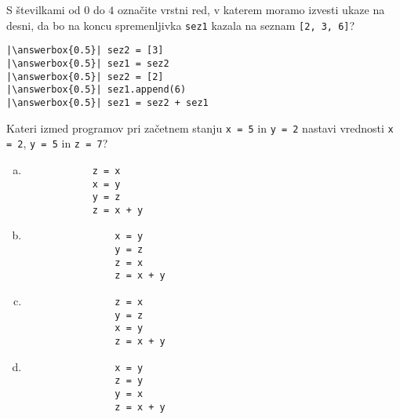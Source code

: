 \documentclass[arhiv, 10pt]{../izpit}
\newcommand{\inlinepy}[1]{\texttt{#1}}
\newcommand{\answerbox}[1]{\framebox{\vphantom{\large M}\hspace{#1cm}}}
\begin{document}
        \naloga*
        \begin{multicols}{2}
        \noindent 
        S številkami od $0$ do $4$ označite vrstni red, v katerem moramo izvesti ukaze na desni, da bo na koncu spremenljivka \inlinepy{sez1} kazala na seznam \inlinepy{[2, 3, 6]}?
    
        \columnbreak
        \noindent
        \begin{verbatim}
|\answerbox{0.5}| sez2 = [3]
|\answerbox{0.5}| sez1 = sez2
|\answerbox{0.5}| sez2 = [2]
|\answerbox{0.5}| sez1.append(6)
|\answerbox{0.5}| sez1 = sez2 + sez1

        \end{verbatim}
        \end{multicols}
    
            
        \naloga*
        
        Kateri izmed programov pri začetnem stanju
            \inlinepy{x = 5} in
            \inlinepy{y = 2}
        nastavi vrednosti
            \inlinepy{x = 2},
            \inlinepy{y = 5} in
            \inlinepy{z = 7}?
    
        \begin{multicols}{4}
        \begin{enumerate}[(a)]
\item 
            \begin{verbatim}
            z = x
            x = y
            y = z
            z = x + y
            \end{verbatim}
        
\item 
                \begin{verbatim}
                x = y
                y = z
                z = x
                z = x + y
                \end{verbatim}
            
\item 
                \begin{verbatim}
                z = x
                y = z
                x = y
                z = x + y
                \end{verbatim}
            
\item 
                \begin{verbatim}
                x = y
                z = y
                y = x
                z = x + y
                \end{verbatim}
            
\end{enumerate}

        \end{multicols}
    
\end{document}

